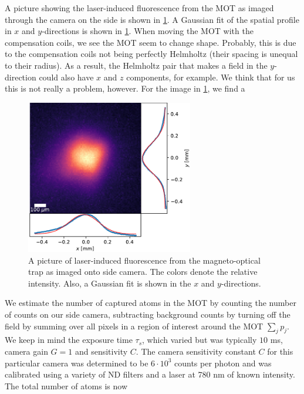 A picture showing the laser-induced fluorescence from the MOT as imaged through the camera on the side is shown in \cref{fig:LiF}.
A Gaussian fit of the spatial profile in $x$ and $y$-directions is shown in \cref{fig:LiF}.
When moving the MOT with the compensation coils, we see the MOT seem to change shape. 
Probably, this is due to the compensation coils not being perfectly Helmholtz (their spacing is unequal to their radius). 
As a result, the Helmholtz pair that makes a field in the $y$-direction could also have $x$ and $z$ components, for example. We think that for us this is not really a problem, however.
For the image in \cref{fig:LiF}, we find a 

\begin{figure}
    \centering
    \includegraphics[width=0.65\textwidth]{figures/FluoresenceAndFits.pdf}
    \caption{A picture of laser-induced fluorescence from the magneto-optical trap as imaged onto side camera. 
    The colors denote the relative intensity.
    Also, a Gaussian fit is shown in the $x$ and $y$-directions.}
    \label{fig:LiF}
\end{figure}

   
We estimate the number of captured atoms in the MOT by counting the number of counts on our side camera, subtracting background counts by turning off the field by summing over all pixels in a region of interest around the MOT $\sum_j p_j$.
We keep in mind the exposure time $\tau_s$, which varied but was typically $10$ ms, camera gain $G = 1$ and sensitivity $C$.
The camera sensitivity constant $C$ for this particular camera was determined to be $6 \cdot 10^3$ counts per photon and was calibrated using a variety of ND filters and a laser at 780 nm of known intensity. The total number of atoms is now
 
